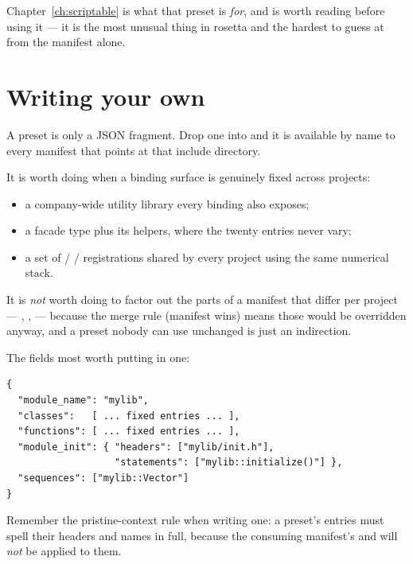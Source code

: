 Chapter~\ref{ch:scriptable} is what that preset is \emph{for}, and is worth
reading before using it --- it is the most unusual thing in rosetta and the
hardest to guess at from the manifest alone.

\section{Writing your own}

A preset is only a JSON fragment. Drop one into
 and it is available by name to every
manifest that points at that include directory.

It is worth doing when a binding surface is genuinely fixed across projects:

\begin{itemize}
  \item a company-wide utility library every binding also exposes;
  \item a facade type plus its helpers, where the twenty entries never vary;
  \item a set of  /  / 
    registrations shared by every project using the same numerical stack.
\end{itemize}

It is \emph{not} worth doing to factor out the parts of a manifest that differ
per project --- , ,
 --- because the merge rule (manifest wins) means those would be
overridden anyway, and a preset nobody can use unchanged is just an indirection.

The fields most worth putting in one:

\begin{lstlisting}[style=json]
{
  "module_name": "mylib",
  "classes":   [ ... fixed entries ... ],
  "functions": [ ... fixed entries ... ],
  "module_init": { "headers": ["mylib/init.h"],
                   "statements": ["mylib::initialize()"] },
  "sequences": ["mylib::Vector"]
}
\end{lstlisting}

\begin{note}
Remember the pristine-context rule when writing one: a preset's
 entries must spell their headers and names in full, because
the consuming manifest's  and  will
\emph{not} be applied to them.
\end{note}
